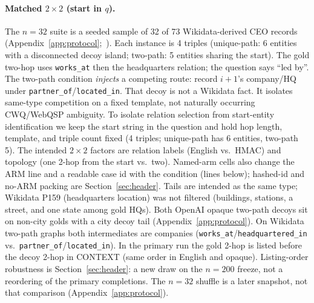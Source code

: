 \documentclass[10pt]{article} %
\begin{document}
\paragraph{Matched $2{\times}2$ (start in $q$).}
\label{par:fact2x2}
The $n{=}32$ suite is a seeded sample of 32 of 73 Wikidata-derived CEO
records (Appendix~\ref{app:protocol};~\citealp{vrandecic2014wikidata}).
Each instance is 4 triples (unique-path: 6 entities with a disconnected
decoy island; two-path: 5 entities sharing the start). The gold two-hop
uses \texttt{works\_at} then the headquarters relation; the question says
``led by''.
The two-path condition \emph{injects} a competing route: record $i{+}1$'s
company/HQ under \texttt{partner\_of}/\texttt{located\_in}.
That decoy is not a Wikidata fact. It isolates same-type competition on a
fixed template, not naturally occurring CWQ/WebQSP ambiguity.
To isolate relation selection from start-entity identification we keep the
start string in the question and hold hop length, template, and triple count
fixed (4 triples; unique-path has 6 entities, two-path 5). The intended $2{\times}2$ factors are relation labels
(English vs.\ HMAC) and topology (one 2-hop from the start vs.\ two).
Named-arm cells also change the ARM line and a readable case id with the
condition (lines below); hashed-id and no-ARM packing are
Section~\ref{sec:header}.
Tails are intended as the same type; Wikidata P159 (headquarters location)
was not filtered
(buildings, stations, a street, and one state among gold HQs).
Both OpenAI opaque two-path decoys sit on non-city golds with a city decoy
tail (Appendix~\ref{app:protocol}).
On Wikidata two-path graphs both intermediates are companies
(\texttt{works\_at}/\texttt{headquartered\_in} vs.\
\texttt{partner\_of}/\texttt{located\_in}).
In the primary run the gold 2-hop is listed before the decoy 2-hop in
CONTEXT (same order in English and opaque). Listing-order robustness is
Section~\ref{sec:header}: a new draw on the $n{=}200$ freeze, not a
reordering of the primary completions.
The $n{=}32$ shuffle is a later snapshot, not that comparison
(Appendix~\ref{app:protocol}).
\end{document}
